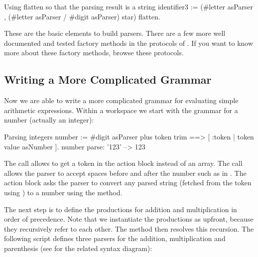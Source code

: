 \documentclass[a4paper,10pt,twoside]{book}
\begin{document}
\begin{script}{Using flatten so that the parsing result is a string}
identifier3 := (#letter asParser , (#letter asParser / #digit asParser) star) flatten.
\end{script}

These are the basic elements to build parsers. There are a few more
well documented and tested factory methods in the 
protocols of . If you want to know more about these
factory methods, browse these protocols.

\subsection{Writing a More Complicated Grammar}

Now we are able to write a more complicated grammar for evaluating
simple arithmetic expressions. Within a workspace we start with the
grammar for a number (actually an integer):

\begin{script}[number]{Parsing integers}
number :=  #digit asParser plus token trim ==> [ :token | token value asNumber ].
number parse: '123'             --> 123
\end{script}


The  call allows to get a token in the action block instead
of an array. The  call allows the parser to accept spaces
before and after the number such as in . The action block
asks the parser to convert any parsed string (fetched from the token
using ) to a number using the
 method.

The next step is to define the productions for addition and
multiplication in order of precedence. Note that we instantiate the
productions as  upfront, because they recursively
refer to each other. The method  then resolves this
recursion. The following script defines three parsers for the
addition, multiplication and parenthesis (see 
for the related syntax diagram):
\end{document}

